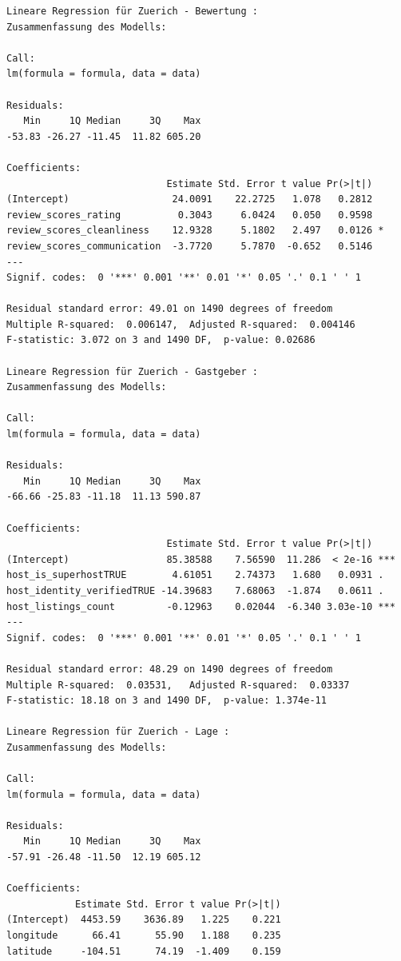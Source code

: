\documentclass[
  journal,
]{IEEEtran}%
\begin{document}
\begin{verbatim}
Lineare Regression für Zuerich - Bewertung :
Zusammenfassung des Modells:

Call:
lm(formula = formula, data = data)

Residuals:
   Min     1Q Median     3Q    Max 
-53.83 -26.27 -11.45  11.82 605.20 

Coefficients:
                            Estimate Std. Error t value Pr(>|t|)  
(Intercept)                  24.0091    22.2725   1.078   0.2812  
review_scores_rating          0.3043     6.0424   0.050   0.9598  
review_scores_cleanliness    12.9328     5.1802   2.497   0.0126 *
review_scores_communication  -3.7720     5.7870  -0.652   0.5146  
---
Signif. codes:  0 '***' 0.001 '**' 0.01 '*' 0.05 '.' 0.1 ' ' 1

Residual standard error: 49.01 on 1490 degrees of freedom
Multiple R-squared:  0.006147,  Adjusted R-squared:  0.004146 
F-statistic: 3.072 on 3 and 1490 DF,  p-value: 0.02686

Lineare Regression für Zuerich - Gastgeber :
Zusammenfassung des Modells:

Call:
lm(formula = formula, data = data)

Residuals:
   Min     1Q Median     3Q    Max 
-66.66 -25.83 -11.18  11.13 590.87 

Coefficients:
                            Estimate Std. Error t value Pr(>|t|)    
(Intercept)                 85.38588    7.56590  11.286  < 2e-16 ***
host_is_superhostTRUE        4.61051    2.74373   1.680   0.0931 .  
host_identity_verifiedTRUE -14.39683    7.68063  -1.874   0.0611 .  
host_listings_count         -0.12963    0.02044  -6.340 3.03e-10 ***
---
Signif. codes:  0 '***' 0.001 '**' 0.01 '*' 0.05 '.' 0.1 ' ' 1

Residual standard error: 48.29 on 1490 degrees of freedom
Multiple R-squared:  0.03531,   Adjusted R-squared:  0.03337 
F-statistic: 18.18 on 3 and 1490 DF,  p-value: 1.374e-11

Lineare Regression für Zuerich - Lage :
Zusammenfassung des Modells:

Call:
lm(formula = formula, data = data)

Residuals:
   Min     1Q Median     3Q    Max 
-57.91 -26.48 -11.50  12.19 605.12 

Coefficients:
            Estimate Std. Error t value Pr(>|t|)
(Intercept)  4453.59    3636.89   1.225    0.221
longitude      66.41      55.90   1.188    0.235
latitude     -104.51      74.19  -1.409    0.159


\end{verbatim}
\end{document}
